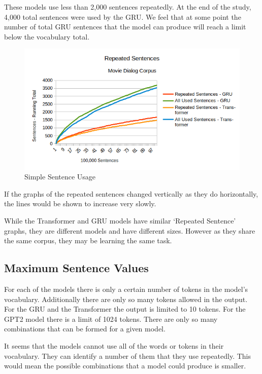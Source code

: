 These models use less than 2,000 sentences repeatedly. At the end of the study, 4,000 total sentences were used by the GRU. We feel that at some point the number of total GRU sentences that the model can produce will reach a limit below the vocabulary total.

\begin{figure}[H]
	\begin{center}
		\includegraphics[scale=0.75]{diagram-100000-sent}
		
		
	\end{center}
	\caption[Simple Sentence Usage]{Simple Sentence Usage}
	\label{diagram-words-limit-shown}
	
\end{figure}

If the graphs of the repeated sentences changed vertically as they do horizontally, the lines would be shown to increase very slowly.

While the Transformer and GRU models have similar `Repeated Sentence' graphs, they are different models and have different sizes. 
However as they share the same corpus, they may be learning the same task.

\subsection{Maximum Sentence Values}

For each of the models there is only a certain number of tokens in the model's vocabulary. Additionally there are only so many tokens allowed in the output. For the GRU and the Transformer the output is limited to 10 tokens. For the GPT2 model there is a limit of 1024 tokens. There are only so many combinations that can be formed for a given model.

It seems that the models cannot use all of the words or tokens in their vocabulary. They can identify a number of them that they use repeatedly. This would mean the possible combinations that a model could produce is smaller.

